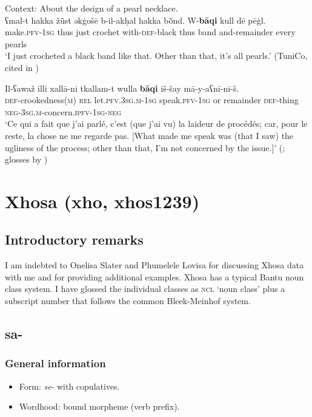 \begin{exe}
	\ex Context: About the design of a pearl necklace.\\
	\gll ʕmal-t hakka žǖst əkġošē b-il-akḥal hakka bȭnd. W-\textbf{bāqi} kull {dē pēġl}.\\
	make.\textsc{pfv}-1\textsc{sg} thus just crochet with-\textsc{def}-black thus band and-remainder every pearls\\
	\glt \lq I just crocheted a black band like that. Other than that, it’s all pearls.\rq{ }(TuniCo, cited in \cite{FischerEtAlTunisian})
	
	\ex \gll Il-ʕawaž illi xallā-ni tkallam-t wulla \textbf{bāqi} iš-šay mā-y-aʕnī-nī-š.\\
	\textsc{def}-crookedness(\textsc{m}) \textsc{rel} let.\textsc{pfv}.3\textsc{sg}.\textsc{m}-1\textsc{sg} speak.\textsc{pfv}-1\textsc{sg} or remainder \textsc{def}-thing \textsc{neg}-3\textsc{sg}.\textsc{m}-concern.\textsc{ipfv}-1\textsc{sg}-\textsc{neg}\\
	\glt \lq Ce qui a fait que j’ai parlé, c’est (que j’ai vu) la laideur de procédés; car, pour le
reste, la chose ne me regarde pas. 	[What made me speak was (that I saw) the ugliness of the process; other than that, I’m not concerned by the issue.]\rq{ }(\cite[366]{MarcaisGuiga19581961}; glosses by \cite{FischerEtAlTunisian})
\end{exe} 

\section{Xhosa (xho, xhos1239)}\label{appendixXhosa}
\subsection{Introductory remarks}\largerpage[2]
I am indebted to Onelisa Slater and Phumelele Lovisa for discussing Xhosa data with me and for providing additional examples. Xhosa has a typical Bantu noun class system. I have glossed the individual classes as \textsc{ncl} \lq noun class' plus a subscript number that follows the common Bleek-Meinhof system.

\subsection{sa-}
\subsubsection{General information}
\begin{itemize}
	\item Form: \textit{se}- with copulatives.
	\item Wordhood: bound morpheme (verb prefix).
\end{itemize}


